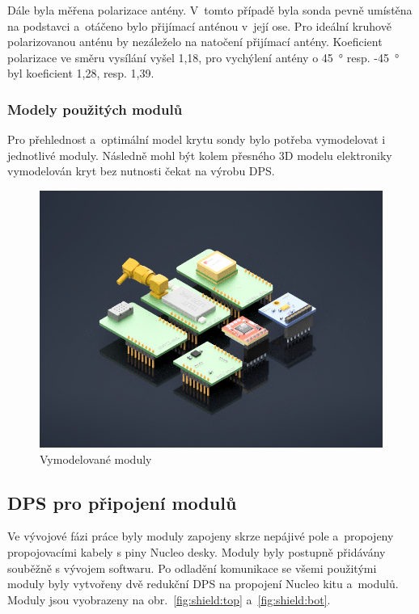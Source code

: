 \documentclass[twoside]{ctuthesis}
\theoremstyle{plain}
\theoremstyle{definition}
\theoremstyle{note}
\begin{document}
			Dále byla měřena polarizace antény. V~tomto případě byla sonda pevně umístěna na podstavci a~otáčeno bylo přijímací anténou v~její ose. Pro ideální kruhově polarizovanou anténu by nezáleželo na natočení přijímací antény. Koeficient polarizace ve směru vysílání vyšel 1,18, pro vychýlení antény o 45~° resp. -45~° byl koeficient 1,28, resp. 1,39.

			
			

			\subsubsection{Modely použitých modulů}
			Pro přehlednost a~optimální model krytu sondy bylo potřeba vymodelovat i jednotlivé moduly. Následně mohl být kolem přesného 3D modelu elektroniky vymodelován kryt bez nutnosti čekat na výrobu DPS.
			\begin{figure}[hbtp]
				\centering
				\includegraphics[width=.7\linewidth]{Figures/modules_assembly.png} 
				\caption{Vymodelované moduly}
				\label{fig:modules:assembly}
			\end{figure}
		

		
		\subsection{DPS pro připojení modulů}
		Ve vývojové fázi práce byly moduly zapojeny skrze nepájivé pole a~propojeny propojovacími kabely s piny Nucleo desky. Moduly byly postupně přidávány souběžně s vývojem softwaru. Po odladění komunikace se všemi použitými moduly byly vytvořeny dvě redukční DPS na propojení Nucleo kitu a~modulů. Moduly jsou vyobrazeny na obr.~\ref{fig:shield:top} a~\ref{fig:shield:bot}. 
\end{document}
